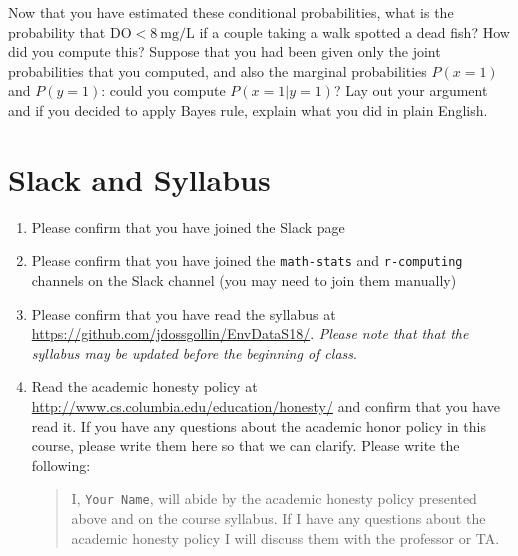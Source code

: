 \documentclass[paper=letter, fontsize=11pt]{scrartcl}
\numberwithin{equation}{section}
\numberwithin{figure}{section}
\numberwithin{table}{section}
\begin{document}
\begin{enumerate}[resume]
  Now that you have estimated these conditional probabilities, what is the probability that $\text{DO}<\SI{8}{\milli\gram\per\liter}$ if a couple taking a walk spotted a dead fish?
  How did you compute this?
  Suppose that you had been given only the joint probabilities that you computed, and also the marginal probabilities $P(x=1)$ and $P(y=1)$: could you compute $P(x=1 | y=1)$?
  Lay out your argument and if you decided to apply Bayes rule, explain what you did in plain English.
\end{enumerate}

\section{Slack and Syllabus}

\begin{enumerate}[resume]
  \item Please confirm that you have joined the Slack page
  \item Please confirm that you have joined the \texttt{math-stats} and \texttt{r-computing} channels on the Slack channel (you may need to join them manually)
  \item Please confirm that you have read the syllabus at \url{https://github.com/jdossgollin/EnvDataS18/}.
  \emph{Please note that that the syllabus may be updated before the beginning of class}.
  \item Read the academic honesty policy at \url{http://www.cs.columbia.edu/education/honesty/} and confirm that you have read it.
  If you have any questions about the academic honor policy in this course, please write them here so that we can clarify.
  Please write the following:
  \begin{quotation}
    I, \texttt{Your Name}, will abide by the academic honesty policy presented above and on the course syllabus.
    If I have any questions about the academic honesty policy I will discuss them with the professor or TA.
  \end{quotation}
\end{enumerate}



\end{document}
